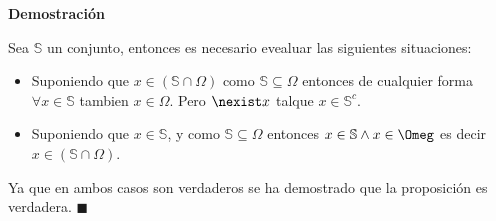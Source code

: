 \documentclass[a4paper,dvipsnames]{book}
\begin{document}
\begin{enumerate}
                \textbf{Demostración}

                Sea $\mathbb S$ un conjunto, entonces es necesario evealuar las
                siguientes situaciones:
                \begin{itemize}
                    \item Suponiendo que $x\in\left(\mathbb S\cap\Omega\right)$
                        como $\mathbb S\subseteq\Omega$ entonces de cualquier
                        forma $\forall x\in\mathbb S$ tambien $x\in\Omega$.
                        Pero $\nexist x$ talque $x\in\mathbb S^{c}$.

                    \item Suponiendo que $x\in\mathbb S$, y como $\mathbb
                        S\subseteq\Omega$ entonces $x\in\mathbb S\land
                        x\in\Omeg$ es decir $x\in\left(\mathbb
                        S\cap\Omega\right)$.
                \end{itemize}

                Ya que en ambos casos son verdaderos se ha demostrado que la
                proposición es verdadera. $\blacksquare$
            \end{enumerate}
\end{document}
